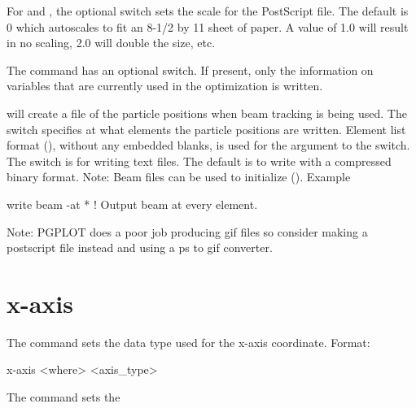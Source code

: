 {{{For  and , the optional  switch sets the
scale for the PostScript file. The default is 0 which autoscales to fit an
8-1/2 by 11 sheet of paper. A value of 1.0 will result in no scaling,
2.0 will double the size, etc.

The  command has an optional 
switch.  If present, only the information on variables that are
currently used in the optimization is written.

 will create a file of the particle positions when
beam tracking is being used. The  switch specifies at what
elements the particle positions are written. Element list format
(), without any embedded blanks, is used for
the  argument to the  switch. The
 switch is for writing text files. The default is to write
with a compressed binary format.  Note: Beam files can be used to
initialize \tao (). Example
\begin{example}
  write beam -at *   ! Output beam at every element.
\end{example}

Note: PGPLOT does a poor job producing gif files so consider
making a postscript file instead and using a ps to gif converter.

\section{x-axis}
\label{s:x.axis}

The  command sets the data type used for the x-axis coordinate.
Format:
\begin{example}
  x-axis <where> <axis_type>
\end{example}

\vskip 0.1in 
The  command sets the \vn{plot%
what data is used for the horizontal axis. Possibilities
for \vn{<axis_type>} are:
\begin{example}
  index     -- Use data index
  ele_index -- Use data element index
  s         -- Use longitudinal position.
\end{example}
Note that \vn{index} only makes sense for data that has an index
associated with it.

Examples:
\begin{example}
  x-axis * s
  x-axis top index
\end{example}

}}}}
